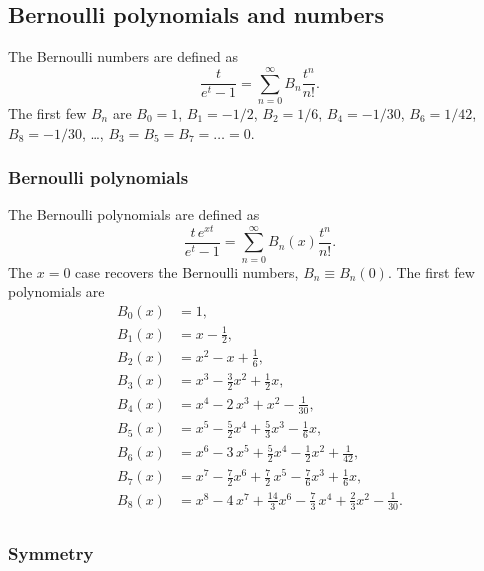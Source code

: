 \documentclass[aip,jcp,preprint,notitlepage, superscriptaddress]{revtex4-1}
\begin{document}
\subsection{Bernoulli polynomials and numbers}



The Bernoulli numbers are defined as
%
\begin{equation}
  \frac{ t }
  {e^t - 1}
=
\sum_{n = 0}^\infty
  B_n \frac{ t^n } { n! }.
\label{eq:Bernoulli_number}
\end{equation}
%
The first few $B_n$ are\cite{
  whittaker, arfken, abramowitz, wang_specfunc}
$B_0 = 1$,
$B_1 = -1/2$,
$B_2 = 1/6$,
$B_4 = -1/30$,
$B_6 = 1/42$,
$B_8 = -1/30$,
\dots,
$B_3 = B_5 = B_7 = \dots = 0$.



\subsubsection{Bernoulli polynomials}



The Bernoulli polynomials are defined as
%
\begin{equation}
  \frac{ t \, e^{x t} }
  {e^t - 1}
=
\sum_{n = 0}^\infty
  B_n(x) \frac{ t^n } { n! }.
\label{eq:Bernoulli_polynomial}
\end{equation}
%
The $x = 0$ case
recovers the Bernoulli numbers,
$B_n \equiv B_n(0)$.
%
The first few polynomials are\cite{
  whittaker, arfken, abramowitz, wang_specfunc}
\begin{align*}
B_0(x) &= 1, \\
B_1(x) &= x - \frac 1 2, \\
B_2(x) &= x^2 - x + \frac 1 6, \\
B_3(x) &= x^3 - \frac 3 2 x^2 + \frac 1 2 x, \\
B_4(x) &= x^4 - 2 \, x^3 + x^2 - \frac{1}{30}, \\
B_5(x) &= x^5 - \frac 5 2 x^4 + \frac 5 3 x^3 - \frac{1}{6} x, \\
B_6(x) &= x^6 - 3 \, x^5 + \frac 5 2 x^4 - \frac 1 2 x^2 + \frac{1}{42}, \\
B_7(x) &= x^7 - \frac 7 2 x^6 + \frac 7 2 \, x^5 - \frac 7 6 x^3 + \frac 1 6 x, \\
B_8(x) &= x^8 - 4 \, x^7 + \frac{14} 3 x^6 - \frac 7 3 \, x^4 + \frac 2 3 x^2 - \frac{1}{30}. \\
\end{align*}




\subsubsection{Symmetry}
\end{document}

